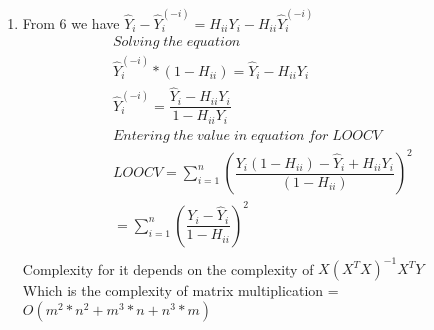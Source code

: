 \begin{enumerate}
\item From 6 we have  $\hat{Y}_i - \hat{Y}_i^{(-i)} = H_{ii}Y_i - H_{ii}\hat{Y}_i^{(-i)}$
\begin{align*}
Solving \; the \; equation \\
\hat{Y}_i^{(-i)} * \left( 1 - H_{ii} \right) = \hat{Y}_i - H_{ii}Y_{i} \\
\hat{Y}_{i}^{(-i)} = \dfrac{\hat{Y}_i - H_{ii}Y_i}{1 - H_{ii}Y_{i}} \\
Entering \; the \; value \; in \;equation \;for \; LOOCV \\
LOOCV = \sum\limits_{i=1}^{n}\left( \dfrac{Y_i \left(1 - H_{ii}\right) - \hat{Y}_i + H_{ii}Y_i}{(1 - H_{ii})} \right)^2\\
               =  \sum\limits_{i=1}^{n} \left( \dfrac{Y_i - \hat{Y}_i} {1 - H_{ii}} \right)^2 \\
\end{align*}
Complexity for it depends on the complexity of $X (X^T X)^{-1}X^T Y$ \\
Which is the complexity of matrix multiplication  = $O(m^2*n^2 + m^3 *n + n^3 * m)$

\end{enumerate}
